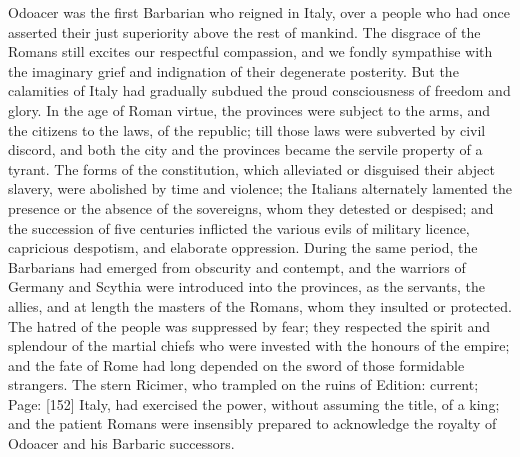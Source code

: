 Odoacer was the first Barbarian who reigned in Italy, over a people who had once asserted their just superiority above the rest of mankind. The disgrace of the Romans still excites our respectful compassion, and we fondly sympathise with the imaginary grief and indignation of their degenerate posterity. But the calamities of Italy had gradually subdued the proud consciousness of freedom and glory. In the age of Roman virtue, the provinces were subject to the arms, and the citizens to the laws, of the republic; till those laws were subverted by civil discord, and both the city and the provinces became the servile property of a tyrant. The forms of the constitution, which alleviated or disguised their abject slavery, were abolished by time and violence; the Italians alternately lamented the presence or the absence of the sovereigns, whom they detested or despised; and the succession of five centuries inflicted the various evils of military licence, capricious despotism, and elaborate oppression. During the same period, the Barbarians had emerged from obscurity and contempt, and the warriors of Germany and Scythia were introduced into the provinces, as the servants, the allies, and at length the masters of the Romans, whom they insulted or protected. The hatred of the people was suppressed by fear; they respected the spirit and splendour of the martial chiefs who were invested with the honours of the empire; and the fate of Rome had long depended on the sword of those formidable strangers. The stern Ricimer, who trampled on the ruins of Edition: current; Page: [152] Italy, had exercised the power, without assuming the title, of a king; and the patient Romans were insensibly prepared to acknowledge the royalty of Odoacer and his Barbaric successors.

